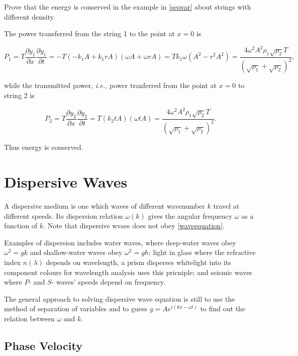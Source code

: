 \documentclass[a4paper,12pt]{report}
\begin{document}
{Prove that the energy is conserved in the example in \cref{sepvar} about strings with different density.}
{The power transferred from the string 1 to the point at \(x = 0\) is

\begin{equation}
	P_1  = T \frac{\partial y_1 }{\partial x}\frac{\partial y_1 }{\partial t} = -T(-k_1 A + k_1 rA)(\omega A+\omega rA) = Tk_1 \omega (A^2-r^2A^2) = \frac{4 \omega ^2A^2 \rho _{1} \sqrt{\rho _{2} }T }{(\sqrt{\rho _{1}}+\sqrt{\rho _{2} }  )^2}, 
\end{equation}

while the transmitted power, \textit{i.e.,} power tranferred from the point at \(x=0\) to string 2 is

\begin{equation}
	P_2  = T \frac{\partial y_2 }{\partial x}\frac{\partial y_2 }{\partial t} = T(k_2 tA)(\omega tA) =   \frac{4 \omega ^2A^2 \rho _{1} \sqrt{\rho _{2} }T }{(\sqrt{\rho _{1}}+\sqrt{\rho _{2} }  )^2}.
\end{equation}

Thus energy is conserved.

} 

\section{Dispersive Waves}

A dispersive medium is one which waves of different wavenumber \(k\) travel at different speeds. Its dispersion relation \(\omega (k)\) gives the angular frequency \(\omega \) as a function of \(k\). Note that dispersive wvaes does not obey \cref{waveequation}.

Examples of dispersion includes water waves, where deep-water waves obey \(\omega ^2 = gk\) and shallow-water waves obey \(\omega ^2 = gh\); light in glass where the refractive index \(n(\lambda )\) depends on wavelength, a prism disperses whitelight into its component colours for wavelength analysis uses this pricniple; and seismic waves where \(P\)- and \(S\)- waves' speeds depend on frequency.    

The general approach to solving dispersive wave equation is still to use the method of separation of variables and to guess \(y = A e^{i (kx-\omega t)} \) to find out the relation between \(\omega \text { and } k\).   

\subsection{Phase Velocity}
\end{document}
